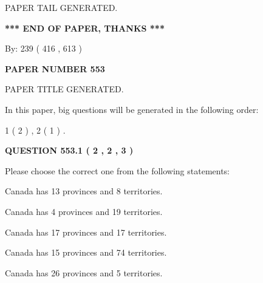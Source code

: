 \documentclass[12pt]{article}
\begin{document}
   
   
\vspace{2.0in} PAPER TAIL GENERATED.
   
   
   
   
\vspace{1.0in} 
{\textbf{\large{ *** END OF PAPER, THANKS *** }}} 
   
   
\hspace{1.0in} By: 
 239 ( 416 ,  613 )
   
   
   
   
\newpage 
\setcounter{page}{ 
   553001 } 
   
   
   
   
 {\textbf{ \Large{ PAPER NUMBER  553  }}}
   
   
\vspace{0.2in}
   
   
   
   
   
   
   
   
 \vspace{0.2in}
 
 
 
 
   
   
 PAPER TITLE GENERATED.
   
   
   
\vspace{0.2in}
   
In this paper, big questions will be generated in the following order: 
   
   
   1 ( 2 )
 ,
   2 ( 1 )
 .
  
\vspace{0.2in}
  
{\textbf{\Large{QUESTION
553.1 
 ( 2 , 2 , 3 )
}}}
  
  
Please choose the correct one from the following statements:
 
 
Canada has  13 provinces and  8 territories.
 
 
Canada has   4 provinces and  19 territories.
 
 
Canada has  17 provinces and  17 territories.
 
 
Canada has  15 provinces and  74 territories.
 
 
Canada has  26 provinces and  5 territories.
 
\end{document}
